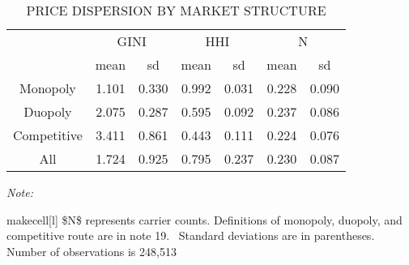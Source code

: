 \begin{table}
	\caption{PRICE DISPERSION BY MARKET STRUCTURE}
	\centering
\begin{threeparttable}
\begin{tabular}[t]{ccccccc}
	\toprule
	\multicolumn{1}{c}{ } & \multicolumn{2}{c}{GINI} & \multicolumn{2}{c}{HHI} & \multicolumn{2}{c}{N} \\
	\cmidrule(l{3pt}r{3pt}){2-3} \cmidrule(l{3pt}r{3pt}){4-5} \cmidrule(l{3pt}r{3pt}){6-7}
	  & mean & sd & mean  & sd  & mean   & sd  \\
	\midrule
	Monopoly & 1.101 & 0.330 & 0.992 & 0.031 & 0.228 & 0.090\\
	Duopoly & 2.075 & 0.287 & 0.595 & 0.092 & 0.237 & 0.086\\
	Competitive & 3.411 & 0.861 & 0.443 & 0.111 & 0.224 & 0.076\\
	All & 1.724 & 0.925 & 0.795 & 0.237 & 0.230 & 0.087\\
	\bottomrule
\end{tabular}
\begin{tablenotes}
	\item \textit{Note: } 
	\item makecell[l]{ \$N\$ represents carrier counts. Definitions of monopoly, duopoly, and competitive route are in note 19. \           Standard deviations are in parentheses. Number of observations is 248,513}
\end{tablenotes}
\end{threeparttable}
\end{table}
